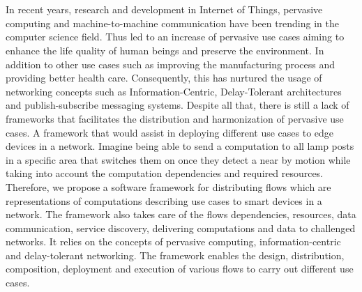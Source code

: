 \chapter{\abstractname}
In recent years, research and development in Internet of Things, pervasive computing and machine-to-machine communication have been trending  in the computer science field. Thus led to an increase of pervasive use cases aiming to enhance the  life quality of human beings and preserve the environment. In addition to other use cases such as improving the manufacturing  process and providing better health care. Consequently, this has nurtured  the usage of networking concepts such as Information-Centric, Delay-Tolerant architectures and publish-subscribe messaging systems. Despite all that, there is still a lack of frameworks that facilitates the distribution and harmonization of pervasive use cases. A framework that would assist in deploying different use cases to edge devices in a network. Imagine being able to send a computation to all lamp posts in a specific area that switches them on once they detect a near by motion while taking into account the computation dependencies and required resources. %
 Therefore, we propose a software framework for distributing flows which are representations of computations describing use cases to smart devices in a network. The framework also takes care of the flows dependencies, resources, data communication, service discovery, delivering computations and data to challenged networks. It relies on the concepts of pervasive computing, information-centric and delay-tolerant networking. The framework enables the design, distribution, composition, deployment and execution of various flows to carry out different use cases.



